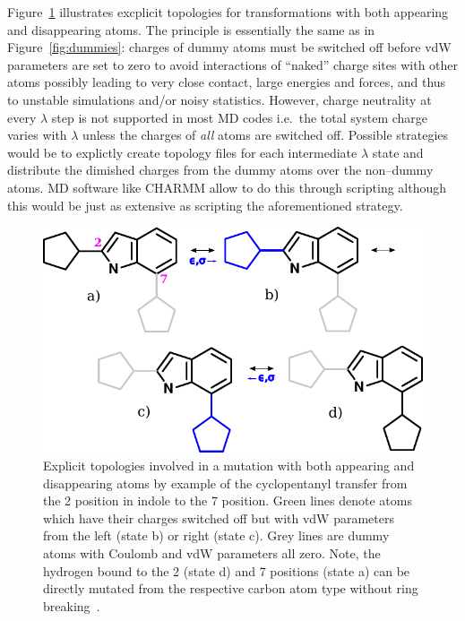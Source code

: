 \documentclass[journal=jctcce,manuscript=suppinfo]{achemso}
\begin{document}
Figure~\ref{fig:dummies2} illustrates excplicit topologies for
transformations with both appearing and disappearing atoms.  The
principle is essentially the same as in Figure~\ref{fig:dummies}:
charges of dummy atoms must be switched off before vdW parameters are
set to zero to avoid interactions of ``naked'' charge sites with other
atoms possibly leading to very close contact, large energies and
forces, and thus to unstable simulations and/or noisy statistics.
However, charge neutrality at every $\lambda$ step is not supported in
most MD codes i.e.\ the total system charge varies with $\lambda$
unless the charges of \emph{all} atoms are switched off.  Possible
strategies would be to explictly create topology files for each
intermediate $\lambda$ state and distribute the dimished charges from
the dummy atoms over the non--dummy atoms.  MD software like CHARMM
allow to do this through scripting although this would be just as
extensive as scripting the aforementioned strategy.

\begin{figure}[ht]
\includegraphics[scale=1.0]{figures/dummies2.pdf}
\caption{Explicit topologies involved in a mutation with both
  appearing and disappearing atoms by example of the cyclopentanyl
  transfer from the 2 position in indole to the 7 position.  Green
  lines denote atoms which have their charges switched off but with
  vdW parameters from the left (state b) or right (state c). Grey
  lines are dummy atoms with Coulomb and vdW parameters all zero.
  Note, the hydrogen bound to the 2 (state d) and 7 positions (state
  a) can be directly mutated from the respective carbon atom type
  without ring breaking~\cite{doi:10.1021/acs.jcim.5b00057}.}
\label{fig:dummies2}
\end{figure}
\end{document}
